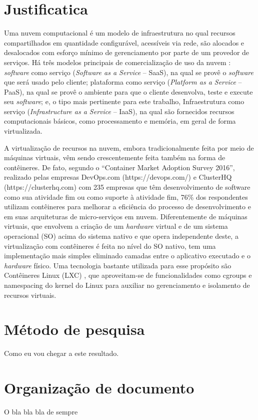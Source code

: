 \section{Justificatica}

Uma nuvem computacional é um modelo de infraestrutura no qual recursos compartilhados em quantidade configurável, acessíveis via rede, são alocados e desalocados com esforço mínimo de gerenciamento por parte de um provedor de serviços. \cite{NIST2011}
%
Há três modelos principais de comercialização de uso da nuvem \cite{NIST2011}: \textit{software} como serviço (\textit{Software as a Service} -- SaaS), na qual se provê o \textit{software} que será usado pelo cliente; plataforma como serviço (\textit{Platform as a Service} -- PaaS), na qual se provê o ambiente para que o cliente desenvolva, teste e execute seu \textit{software}; e, o tipo mais pertinente para este trabalho, Infraestrutura como serviço (\textit{Infrastructure as a Service} -- IaaS), na qual são fornecidos recursos computacionais básicos, como processamento e memória, em geral de forma virtualizada.


A virtualização de recursos na nuvem, embora tradicionalmente feita por meio de máquinas virtuais, vêm sendo crescentemente feita também na forma de contêineres.
%
De fato, segundo o ``Container Market Adoption Survey 2016'', realizado pelas empresas DevOps.com (https://devops.com/) e ClusterHQ (https://clusterhq.com) com 235 empresas que têm desenvolvimento de software como sua atividade fim ou como suporte à atividade fim, 76\% dos respondentes utilizam contêineres para melhorar a eficiência do processo de desenvolvimento e em suas arquiteturas de micro-serviços em nuvem.
%
Diferentemente de máquinas virtuais, que envolvem a criação de um \textit{hardware} virtual e de um sistema operacional (SO) acima do sistema nativo e que opera independente deste, a virtualização com contêineres é feita no nível do SO nativo, tem uma implementação mais simples eliminado camadas entre o aplicativo executado e o \textit{hardware} físico.
%
Uma tecnologia bastante utilizada para esse propósito são Contêineres Linux (LXC) \cite{Linuxcontainers.org2015}, que aproveitam-se de funcionalidades como cgroups e namespacing do kernel do Linux para auxiliar no gerenciamento e isolamento de recursos virtuais.


\section{Método de pesquisa}

Como eu vou chegar a este resultado.

\section{Organização de documento}

O bla bla bla de sempre
